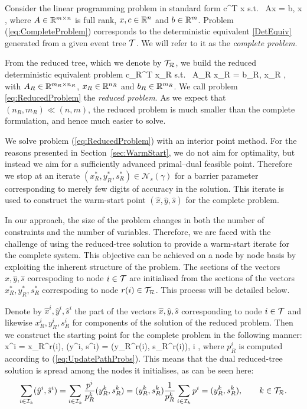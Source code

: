 Consider the linear programming problem in standard form
\be  \label{eq:CompleteProblem}
  \min\; c^T x \;\qquad \mbox{s.t. }\; Ax = b, \;\; x ,
\ee
where $A \in \mathbb{R}^{m \times n}$ is full rank, 
$x, c \in \mathbb{R}^{n}$ and $b \in \mathbb{R}^{m}$. 
Problem (\ref{eq:CompleteProblem})
corresponds to the deterministic equivalent \eqref{DetEquiv} generated from a
given event tree $\mathcal{T}$. We will refer to it as the 
{\em complete problem}.

From the reduced tree, which we denote by $\mathcal{T}_\mathcal{R}$, 
we build the reduced deterministic 
equivalent problem
\be \label{eq:ReducedProblem}
\min\; c_R^T x_R \;\quad \mbox{s.t. }\; A_R x_R = b_R, \; x_R ,
\ee
with $A_R \in \mathbb{R}^{m_R\times n_R}$, $x_R \in 
\mathbb{R}^{n_R}$ and $b_R \in \mathbb{R}^{m_R}$. 
We call problem \eqref{eq:ReducedProblem} the {\em reduced problem}.
As we expect that $(n_R, m_R) \ll (n, m)$, the reduced problem is 
much smaller than the complete formulation, and hence much easier to solve.

We solve problem (\ref{eq:ReducedProblem}) with an interior point method. 
For the reasons presented in Section~\ref{sec:WarmStart}, we do not 
aim for optimality, but instead we aim for a sufficiently advanced 
primal--dual feasible point. Therefore we stop at an iterate
$(x_R^*,y_R^*,s_R^*)\in\mathcal{N}_s(\gamma)$ for a
barrier parameter corresponding to merely few digits of accuracy 
in the solution.
This iterate is used to construct the warm-start point
$(\hat{x}, \hat{y}, \hat{s})$ for the complete problem.

In our approach, the size of the problem changes in both 
the number of constraints and the number of variables.
Therefore, we are faced with the challenge of using 
the reduced-tree solution to provide a warm-start iterate for 
the complete system.
This objective can be achieved on a node by node basis 
by exploiting the inherent structure of the problem.
The sections of the vectors
$\hat{x}, \hat{y}, \hat{s}$ correspoding to node $i\in\mathcal{T}$ are
initialised from the sections of the vectors 
$x_R^*,y_R^*,s_R^*$ correspoding to node $r(i)\in\mathcal{T}_\mathcal{R}$. This process
will be detailed below.

Denote by $\hat x^{i}, \hat y^{i}, \hat s^{i}$ the part of the vectors
$\hat{x}, \hat{y}, \hat{s}$ corresponding to node $i\in\mathcal{T}$ and likewise
$x_R^{i}, y_R^{i},  s_R^{i}$ for components of the solution of the
reduced problem. Then we construct the starting point for the complete
problem in the following manner:
\be  \label{eq:WarmstartSolution}
  \hat x^{i} = x_R^{r(i)}, \qquad 
 (\hat y^{i}, \hat s^{i}) =  (y_R^{r(i)}, s_R^{r(i)}),
  \qquad i \in \Ctree,
\ee
where $p^i_R$ is computed according to (\ref{eq:UpdatePathProbs}).
This means that the dual reduced-tree solution is spread among the
nodes it initialises, as can be seen here:
\[
   \sum_{i \in \mathcal{I}_k} (\hat y^i, \hat s^i)
  = \sum_{i \in \mathcal{I}_k} \frac{p^i}{p^k_R} (y^k_R, s^k_R)
  = (y^k_R, s^k_R) \frac{1}{p^k_R} \sum_{i \in \mathcal{I}_k} p^i 
  = (y^k_R, s^k_R), \qquad k \in \mathcal{T}_\mathcal{R}.
\]

